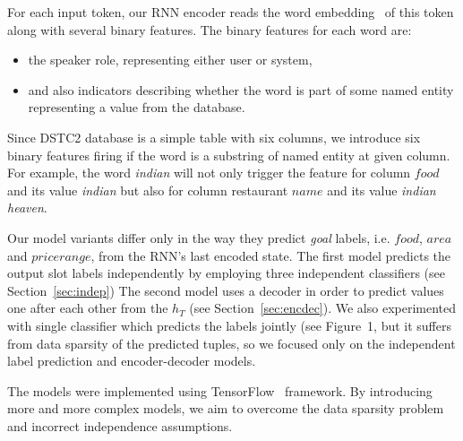 \documentclass{itatnew}
\begin{document}
For each input token, our RNN encoder reads the word embedding~\cite{bengio2003neural} of this token along with several binary features. 
The binary features for each word are:
\begin{itemize}
	\item the speaker role, representing either user or system,
    \item and also indicators describing whether the word is part of some named entity representing a value from the database.
\end{itemize}
  
Since DSTC2 database is a simple table with six columns, we introduce six binary features firing if the word is a substring of named entity at given column.
For example, the word {\it indian} will not only trigger the feature for column $food$ and its value {\it indian} but also for column restaurant $name$ and its value {\it indian heaven}.

Our model variants differ only in the way they predict {\it goal} labels, i.e. $food$, $area$ and $price range$, from the RNN's last encoded state.
The first model predicts the output slot labels independently by employing three independent classifiers (see Section~\ref{sec:indep})
The second model uses a decoder in order to predict values one after each other from the $h_{T}$ (see Section~\ref{sec:encdec}).
We also experimented with single classifier which predicts the labels jointly (see Figure~1, but it suffers from data sparsity of the predicted tuples, so we focused only on the independent label prediction and encoder-decoder models.

The models were implemented using TensorFlow~\cite{abaditensorflow} framework. By introducing more and more complex models, we aim to overcome the data sparsity problem and incorrect independence assumptions.
\end{document}
